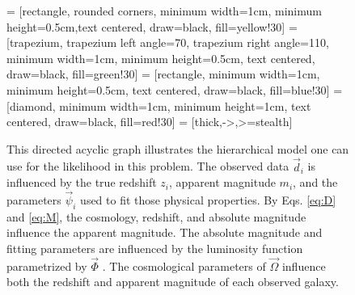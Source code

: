 \documentclass[12pt, onecolumn]{emulateapj}
\begin{document}
\begin{figure}
\vspace{0.5cm}
\begin{center}
\label{fig:flow}
 = [rectangle, rounded corners, minimum width=1cm, minimum height=0.5cm,text centered, draw=black, fill=yellow!30]
 = [trapezium, trapezium left angle=70, trapezium right angle=110, minimum width=1cm, minimum height=0.5cm, text centered, draw=black, fill=green!30]
 = [rectangle, minimum width=1cm, minimum height=0.5cm, text centered, draw=black, fill=blue!30]
 = [diamond, minimum width=1cm, minimum height=1cm, text centered, draw=black, fill=red!30]
 = [thick,->,>=stealth]

\usetikzlibrary{fit}
\caption{This directed acyclic graph illustrates the hierarchical model one can use for the likelihood in this problem.  The observed data $\vec{d}_{i}$ is influenced by the true redshift $z_{i}$, apparent magnitude $m_{i}$, and the parameters $\vec{\psi}_{i}$ used to fit those physical properties.  By Eqs. \ref{eq:D} and \ref{eq:M}, the cosmology, redshift, and absolute magnitude influence the apparent magnitude.  The absolute magnitude and fitting parameters are influenced by the luminosity function parametrized by $\vec{\Phi}$%
. The cosmological parameters of $\vec{\Omega}$ influence both the redshift and apparent magnitude of each observed galaxy.}
\end{center}
\end{figure}
\end{document}
